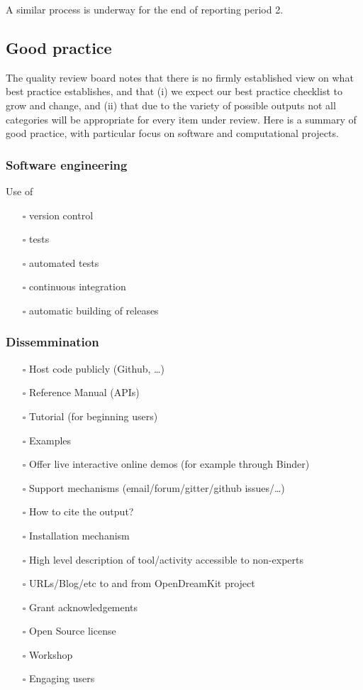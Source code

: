 A similar process is underway for the end of reporting period 2.


\subsection{Good practice}

The quality review board notes that there is no firmly established
view on what best practice establishes, and that (i) we expect our
best practice checklist to grow and change, and (ii) that due to the
variety of possible outputs not all categories will be appropriate for
every item under review. Here is a summary of good practice, with
particular focus on software and computational projects.

\subsubsection{Software engineering}
\label{sec:org2e9824e}

Use of
\begin{itemize}
\item[{$\square$}] version control
\item[{$\square$}] tests
\item[{$\square$}] automated tests
\item[{$\square$}] continuous integration
\item[{$\square$}] automatic building of releases
\end{itemize}

\subsubsection{Dissemmination}
\label{sec:org1f65c9b}
\begin{itemize}
\item[{$\square$}] Host code publicly (Github, \ldots{})
\item[{$\square$}] Reference Manual (APIs)
\item[{$\square$}] Tutorial (for beginning users)
\item[{$\square$}] Examples
\item[{$\square$}] Offer live interactive online demos (for example
  through Binder)
\item[{$\square$}] Support mechanisms (email/forum/gitter/github issues/\ldots{})
\item[{$\square$}] How to cite the output?
\item[{$\square$}] Installation mechanism
\item[{$\square$}] High level description of tool/activity accessible to non-experts
\item[{$\square$}] URLs/Blog/etc to and from  OpenDreamKit project
\item[{$\square$}] Grant acknowledgements
\item[{$\square$}] Open Source license
\item[{$\square$}] Workshop
\item[{$\square$}] Engaging users
\end{itemize}

